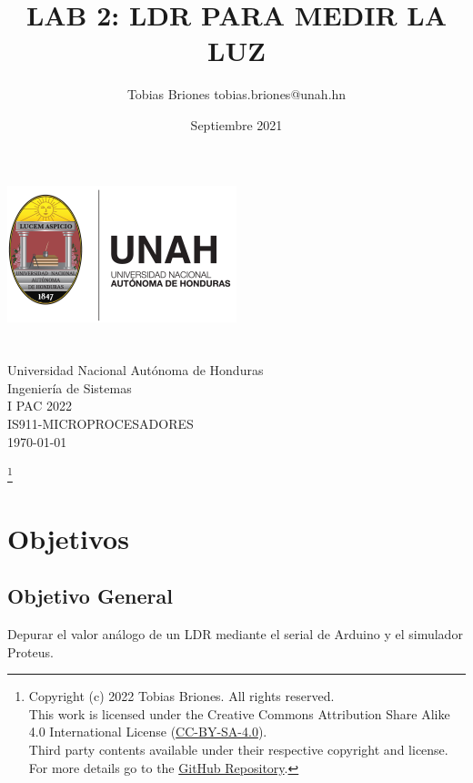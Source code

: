 \documentclass{article}
\title{LAB 2: LDR PARA MEDIR LA LUZ}
\author{Tobias Briones \bigbreak tobias.briones@unah.hn}
\date{Septiembre 2021}
\newcommand\blfootnote[1]{
    \begingroup
    \renewcommand\thefootnote{}\footnote{#1}
    \addtocounter{footnote}{-1}
    \endgroup
}
\begin{document}
    \makeatletter
    \begin{titlepage}
        \begin{center}
            \includegraphics[width=0.3\linewidth]{images/logo-unah}\\[4ex]
            {\huge \bfseries \@title
            \vspace{1cm}}\\[2ex]
            {\LARGE \@author}\\[50ex]

            {\large
            Universidad Nacional Autónoma de Honduras\\
            Ingeniería de Sistemas\\
            I PAC 2022\\
            IS911-MICROPROCESADORES
            }\\[2ex]

            {\large \today}
        \end{center}
    \end{titlepage}
    \makeatother
    \thispagestyle{empty}
    \newpage

    \blfootnote{
        Copyright (c) 2022 Tobias Briones. All rights reserved. \\
        This work is licensed under the Creative Commons Attribution Share
        Alike 4.0 International License (\href{https://spdx
.org/licenses/CC-BY-SA-4.0}{CC-BY-SA-4.0}). \\
        Third party contents available under their respective copyright and
        license.\\
        For more details go to the \href{https://github
.com/tobiasbriones/cp-unah-is911-microprocessors}{GitHub Repository}.}

    \section{Objetivos}

    \subsection{Objetivo General}

    Depurar el valor análogo de un LDR mediante el serial de Arduino y el
    simulador Proteus.
\end{document}
